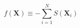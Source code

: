 \documentclass[border=2pt,varwidth]{standalone}
\begin{document}
\[
  f(\mathbf{X}) \equiv -\sum_{i=1}^N S(\mathbf{X}_i)
\]
\end{document}
